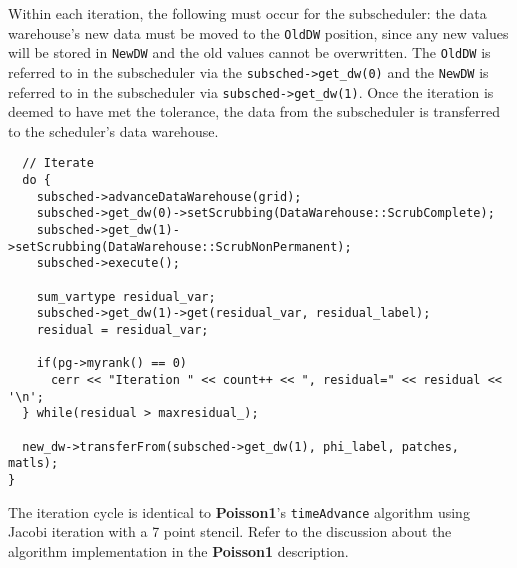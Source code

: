 \documentclass[12pt]{report}
\begin{document}
Within each iteration, the following must occur for the subscheduler:
the data warehouse's new data must be moved to the \texttt{OldDW}
position, since any new values will be stored in \texttt{NewDW} and
the old values cannot be overwritten.  The \texttt{OldDW} is referred
to in the subscheduler via the \texttt{subsched->get\_dw(0)} and the
\texttt{NewDW} is referred to in the subscheduler via
\texttt{subsched->get\_dw(1)}.  Once the iteration is deemed to have
met the tolerance, the data from the subscheduler is transferred to
the scheduler's data warehouse.

\begin{verbatim}
  // Iterate
  do {
    subsched->advanceDataWarehouse(grid);
    subsched->get_dw(0)->setScrubbing(DataWarehouse::ScrubComplete);
    subsched->get_dw(1)->setScrubbing(DataWarehouse::ScrubNonPermanent);
    subsched->execute();    

    sum_vartype residual_var;
    subsched->get_dw(1)->get(residual_var, residual_label);
    residual = residual_var;

    if(pg->myrank() == 0)
      cerr << "Iteration " << count++ << ", residual=" << residual << '\n';
  } while(residual > maxresidual_);

  new_dw->transferFrom(subsched->get_dw(1), phi_label, patches, matls);
}

\end{verbatim}

The iteration cycle is identical to \textbf{Poisson1}'s
\texttt{timeAdvance} algorithm using Jacobi iteration with a 7 point
stencil.  Refer to the discussion about the algorithm implementation
in the \textbf{Poisson1} description.
\end{document}
